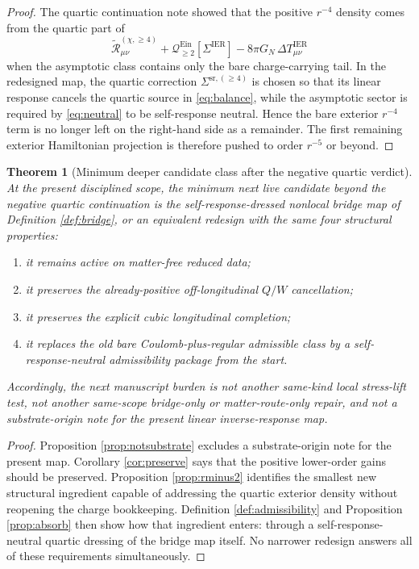 \documentclass[11pt]{article}
\newcommand{\SigmaIER}{\Sigma^{\mathrm{IER}}}
\newcommand{\SigmaSRFour}{\Sigma^{\mathrm{sr},(\ge 4)}}
\newcommand{\ReLongFour}{\widetilde{\mathcal R}_{\mu\nu}^{(\chi,\ge 4)}}
\newcommand{\EinQuad}{\mathcal Q_{\ge 2}^{\mathrm{Ein}}}
\newtheorem{theorem}{Theorem}
\begin{document}
\begin{proof}
The quartic continuation note showed that the positive \(r^{-4}\) density comes from the quartic part of
\[
\ReLongFour+\EinQuad[\SigmaIER]-8\pi G_N\,\Delta T_{\mu\nu}^{\mathrm{IER}}
\]
when the asymptotic class contains only the bare charge-carrying tail. In the redesigned map, the quartic correction \(\SigmaSRFour\) is chosen so that its linear response cancels the quartic source in \eqref{eq:balance}, while the asymptotic sector is required by \eqref{eq:neutral} to be self-response neutral. Hence the bare exterior \(r^{-4}\) term is no longer left on the right-hand side as a remainder. The first remaining exterior Hamiltonian projection is therefore pushed to order \(r^{-5}\) or beyond.
\end{proof}

\begin{theorem}[Minimum deeper candidate class after the negative quartic verdict]
\label{thm:minimum}
At the present disciplined scope, the minimum next live candidate beyond the negative quartic continuation is the self-response-dressed nonlocal bridge map of Definition \ref{def:bridge}, or an equivalent redesign with the same four structural properties:
\begin{enumerate}
    \item it remains active on matter-free reduced data;
    \item it preserves the already-positive off-longitudinal \(Q/W\) cancellation;
    \item it preserves the explicit cubic longitudinal completion;
    \item it replaces the old bare Coulomb-plus-regular admissible class by a self-response-neutral admissibility package from the start.
\end{enumerate}
Accordingly, the next manuscript burden is not another same-kind local stress-lift test, not another same-scope bridge-only or matter-route-only repair, and not a substrate-origin note for the present linear inverse-response map.
\end{theorem}

\begin{proof}
Proposition \ref{prop:notsubstrate} excludes a substrate-origin note for the present map. Corollary \ref{cor:preserve} says that the positive lower-order gains should be preserved. Proposition \ref{prop:rminus2} identifies the smallest new structural ingredient capable of addressing the quartic exterior density without reopening the charge bookkeeping. Definition \ref{def:admissibility} and Proposition \ref{prop:absorb} then show how that ingredient enters: through a self-response-neutral quartic dressing of the bridge map itself. No narrower redesign answers all of these requirements simultaneously.
\end{proof}
\end{document}
